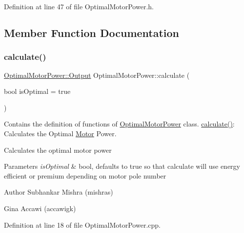 Definition at line 47 of file Optimal\+Motor\+Power.\+h.



\subsection{Member Function Documentation}
\mbox{\label{class_optimal_motor_power_accca3d8da33259697ceeb48f9c2a4547}} 
\subsubsection{\texorpdfstring{calculate()}{calculate()}\hspace{0.1cm}{\footnotesize\ttfamily [1/3]}}
{\footnotesize\ttfamily \hyperlink{struct_optimal_motor_power_1_1_output}{Optimal\+Motor\+Power\+::\+Output} Optimal\+Motor\+Power\+::calculate (\begin{DoxyParamCaption}\item[{bool}]{is\+Optimal = {\ttfamily true} }\end{DoxyParamCaption})}



Contains the definition of functions of \hyperlink{class_optimal_motor_power}{Optimal\+Motor\+Power} class. \hyperlink{class_optimal_motor_power_accca3d8da33259697ceeb48f9c2a4547}{calculate()}\+: Calculates the Optimal \hyperlink{struct_motor}{Motor} Power. 

Calculates the optimal motor power 
\begin{DoxyParams}{Parameters}
{\em is\+Optimal} & bool, defaults to true so that calculate will use energy efficient or premium depending on motor pole number\\
\hline
\end{DoxyParams}
\begin{DoxyAuthor}{Author}
Subhankar Mishra (mishras) 

Gina Accawi (accawigk) 
\end{DoxyAuthor}


Definition at line 18 of file Optimal\+Motor\+Power.\+cpp.

\mbox{\label{class_optimal_motor_power_a8c33958584d48ee046fcd4d56258c3e2}} 
